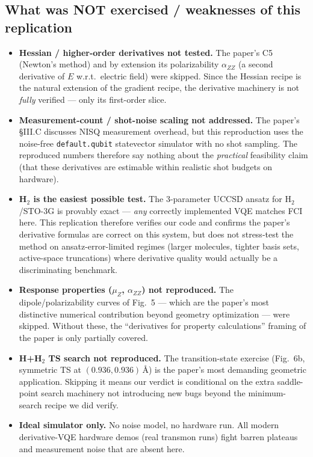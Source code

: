 \documentclass[11pt]{article}
\begin{document}
\subsection*{What was NOT exercised / weaknesses of this replication}
\begin{itemize}
\item \textbf{Hessian / higher-order derivatives not tested.} The paper's C5 (Newton's
      method) and by extension its polarizability $\alpha_{ZZ}$ (a second
      derivative of $E$ w.r.t.\ electric field) were skipped. Since the Hessian
      recipe is the natural extension of the gradient recipe, the derivative
      machinery is not \emph{fully} verified --- only its first-order slice.
\item \textbf{Measurement-count / shot-noise scaling not addressed.} The paper's
      \S III.C discusses NISQ measurement overhead, but this reproduction uses
      the noise-free \texttt{default.qubit} statevector simulator with no shot
      sampling. The reproduced numbers therefore say nothing about the
      \emph{practical} feasibility claim (that these derivatives are estimable
      within realistic shot budgets on hardware).
\item \textbf{H$_2$ is the easiest possible test.} The 3-parameter UCCSD ansatz for
      H$_2$/STO-3G is provably exact --- \emph{any} correctly implemented VQE
      matches FCI here. This replication therefore verifies our code and
      confirms the paper's derivative formulas are correct on this system, but
      does not stress-test the method on ansatz-error-limited regimes (larger
      molecules, tighter basis sets, active-space truncations) where derivative
      quality would actually be a discriminating benchmark.
\item \textbf{Response properties ($\mu_Z$, $\alpha_{ZZ}$) not reproduced.} The
      dipole/polarizability curves of Fig.\ 5 --- which are the paper's most
      distinctive numerical contribution beyond geometry optimization --- were
      skipped. Without these, the ``derivatives for property calculations''
      framing of the paper is only partially covered.
\item \textbf{H+H$_2$ TS search not reproduced.} The transition-state exercise
      (Fig.\ 6b, symmetric TS at $(0.936, 0.936)$\,\AA) is the paper's most
      demanding geometric application. Skipping it means our verdict is
      conditional on the extra saddle-point search machinery not introducing
      new bugs beyond the minimum-search recipe we did verify.
\item \textbf{Ideal simulator only.} No noise model, no hardware run. All modern
      derivative-VQE hardware demos (real transmon runs) fight barren plateaus
      and measurement noise that are absent here.
\end{itemize}
\end{document}

